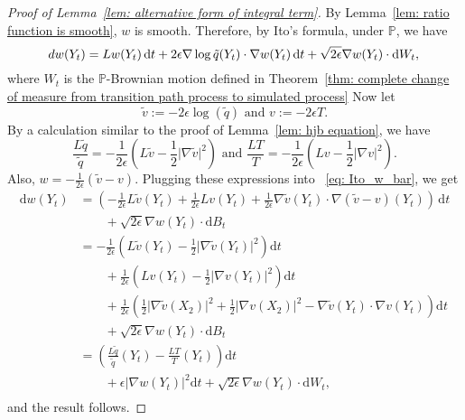 \documentclass[reqno]{amsart}
\newcommand{\1}{\mathds{1}}
\renewcommand{\d}{\mathrm{d}}
\newcommand{\grad}{\nabla}
\renewcommand{\P}{\mathds{P}}
\theoremstyle{definition}
\theoremstyle{remark}
\begin{document}
\begin{proof}[Proof of Lemma~\ref{lem: alternative form of integral term}]
  By Lemma~\ref{lem: ratio function is smooth}, $w$ is smooth. Therefore, by Ito's formula, under $\P$, we have 
  \begin{equation} \label{eq: Ito_w_bar}
    dw(Y_t)=L w(Y_t) \, \d t +2\epsilon \grad \log \tilde{q}(Y_t)\cdot\grad w(Y_t) \, \d t+\sqrt{2\epsilon}\grad  w (Y_t)\cdot \d W_{t}, \\
  \end{equation}
  where $W_t$ is the $\P$-Brownian motion defined in Theorem~\ref{thm: complete change of measure from transition path process to simulated process}
  Now let
  \begin{equation*}
    \tilde{v}:=-2\epsilon\log(\tilde{q})
    \text{ and }
    v:=-2\epsilon T .
  \end{equation*}
  By a calculation similar to the proof of Lemma~\ref{lem: hjb equation}, we have  
  \begin{equation*}
    \frac{L\tilde{q}}{\tilde{q}}=-\frac{1}{2\epsilon}\left(L\tilde{v} - \frac{1}{2}\vert \grad\tilde{v} \vert^{2} \right) \text{ and }
    \frac{L T }{ T }=-\frac{1}{2\epsilon}\left(Lv - \frac{1}{2}\vert \grad v \vert^{2} \right).
  \end{equation*}
  Also, $ w =-\frac{1}{2\epsilon}(\tilde{v}- v )$. 
  Plugging these expressions into ~\eqref{eq: Ito_w_bar}, we get 
  \begin{align*}
    \d  w (Y_t)&=\left(-\frac{1}{2\epsilon}L\tilde{v}(Y_t)+\frac{1}{2\epsilon}L v (Y_t)+\frac{1}{2\epsilon}\grad\tilde{v}(Y_t)\cdot\grad(\tilde{v}- v )(Y_t) \right)\, \d t \\
               &\qquad +\sqrt{2\epsilon}\grad  w (Y_t)\cdot \d B_{t} \\
               &=-\frac{1}{2\epsilon}\left(L\tilde{v}(Y_t)-\frac{1}{2}\vert\grad\tilde{v}(Y_t)\vert^{2}\right)\d t \\
               &\qquad+\frac{1}{2\epsilon}\left(L v (Y_t)-\frac{1}{2}\vert\grad v (Y_t)\vert^{2}\right)\d t \\
               &\qquad+\frac{1}{2\epsilon}\left(\frac{1}{2}\vert\grad\tilde{v}(X_{2})\vert^{2}+\frac{1}{2}\vert\grad v (X_{2})\vert^{2}-\grad\tilde{v}(Y_t)\cdot\grad v (Y_t)\right)\d t \\
               &\qquad+\sqrt{2\epsilon}\grad  w (Y_t)\cdot \d B_{t} \\
               &=\left(\frac{L\tilde{q}}{\tilde{q}}(Y_t)-\frac{L T }{ T }(Y_t)\right)\d t \\
               &\qquad+\epsilon\vert\grad w (Y_t)\vert^{2}\d t+\sqrt{2\epsilon}\grad  w (Y_t)\cdot \d W_{t}, \\
    \end {align*}
    and the result follows.
  \end{proof}
\end{document}
